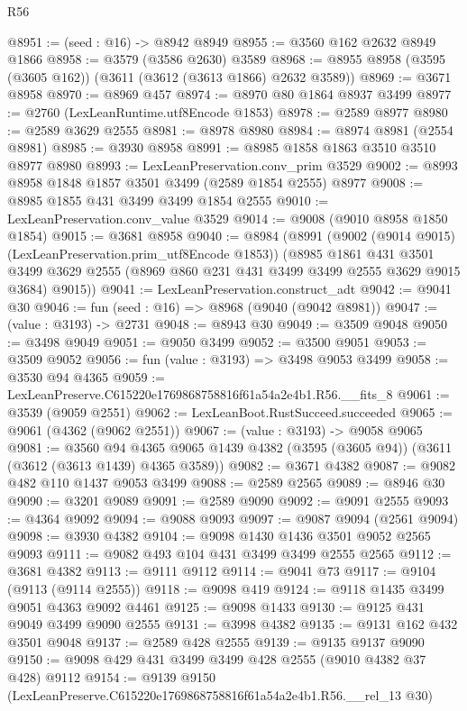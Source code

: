 \begin{lexlean}{R56}
\begin{coremodule}
@8951 := (seed : @16) -> @8942 @8949
@8955 := @3560 @162 @2632 @8949 @1866
@8958 := @3579 (@3586 @2630) @3589
@8968 := @8955 @8958 (@3595 (@3605 @162)) (@3611 (@3612 (@3613 @1866) @2632 @3589))
@8969 := @3671 @8958
@8970 := @8969 @457
@8974 := @8970 @80 @1864 @8937 @3499
@8977 := @2760 (LexLeanRuntime.utf8Encode @1853)
@8978 := @2589 @8977
@8980 := @2589 @3629 @2555
@8981 := @8978 @8980
@8984 := @8974 @8981 (@2554 @8981)
@8985 := @3930 @8958
@8991 := @8985 @1858 @1863 @3510 @3510 @8977 @8980
@8993 := LexLeanPreservation.conv_prim @3529
@9002 := @8993 @8958 @1848 @1857 @3501 @3499 (@2589 @1854 @2555) @8977
@9008 := @8985 @1855 @431 @3499 @3499 @1854 @2555
@9010 := LexLeanPreservation.conv_value @3529
@9014 := @9008 (@9010 @8958 @1850 @1854)
@9015 := @3681 @8958
@9040 := @8984
    (@8991
      (@9002 (@9014 @9015) (LexLeanPreservation.prim_utf8Encode @1853))
      (@8985
        @1861
        @431
        @3501
        @3499
        @3629
        @2555
        (@8969 @860 @231 @431 @3499 @3499 @2555 @3629 @9015 @3684)
        @9015))
@9041 := LexLeanPreservation.construct_adt
@9042 := @9041 @30
@9046 := fun (seed : @16) => @8968 (@9040 (@9042 @8981))
@9047 := (value : @3193) -> @2731
@9048 := @8943 @30
@9049 := @3509 @9048
@9050 := @3498 @9049
@9051 := @9050 @3499
@9052 := @3500 @9051
@9053 := @3509 @9052
@9056 := fun (value : @3193) => @3498 @9053 @3499
@9058 := @3530 @94 @4365
@9059 := LexLeanPreserve.C615220e1769868758816f61a54a2e4b1.R56.__fits_8
@9061 := @3539 (@9059 @2551)
@9062 := LexLeanBoot.RustSucceed.succeeded
@9065 := @9061 (@4362 (@9062 @2551))
@9067 := (value : @3193) -> @9058 @9065
@9081 := @3560
    @94
    @4365
    @9065
    @1439
    @4382
    (@3595 (@3605 @94))
    (@3611 (@3612 (@3613 @1439) @4365 @3589))
@9082 := @3671 @4382
@9087 := @9082 @482 @110 @1437 @9053 @3499
@9088 := @2589 @2565
@9089 := @8946 @30
@9090 := @3201 @9089
@9091 := @2589 @9090
@9092 := @9091 @2555
@9093 := @4364 @9092
@9094 := @9088 @9093
@9097 := @9087 @9094 (@2561 @9094)
@9098 := @3930 @4382
@9104 := @9098 @1430 @1436 @3501 @9052 @2565 @9093
@9111 := @9082 @493 @104 @431 @3499 @3499 @2555 @2565
@9112 := @3681 @4382
@9113 := @9111 @9112
@9114 := @9041 @73
@9117 := @9104 (@9113 (@9114 @2555))
@9118 := @9098 @419
@9124 := @9118 @1435 @3499 @9051 @4363 @9092 @4461
@9125 := @9098 @1433
@9130 := @9125 @431 @9049 @3499 @9090 @2555
@9131 := @3998 @4382
@9135 := @9131 @162 @432 @3501 @9048
@9137 := @2589 @428 @2555
@9139 := @9135 @9137 @9090
@9150 := @9098 @429 @431 @3499 @3499 @428 @2555 (@9010 @4382 @37 @428) @9112
@9154 := @9139 @9150 (LexLeanPreserve.C615220e1769868758816f61a54a2e4b1.R56.__rel_13 @30)

\end{coremodule}
\end{lexlean}
